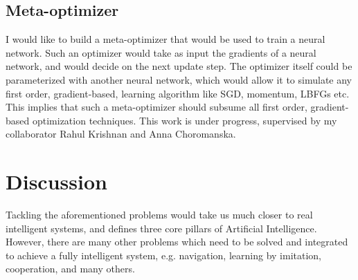 \documentclass{article}
\begin{document}
\subsection{Meta-optimizer}
\label{subsec:meta}
I would like to build a meta-optimizer that would be used to train a
neural network.  Such an optimizer would take as input the gradients
of a neural network, and would decide on the next update step. The
optimizer itself could be parameterized with another neural network,
which would allow it to simulate any first order, gradient-based,
learning algorithm like SGD, momentum, LBFGs etc. This implies that
such a meta-optimizer should subsume all first order, gradient-based
optimization techniques.  This work is under progress, 
supervised by my collaborator Rahul Krishnan and Anna Choromanska.

\section{Discussion}
Tackling the aforementioned problems would take us much closer to
real intelligent systems, and defines three core pillars 
of Artificial Intelligence. However, there are many other problems which 
need to be solved and integrated to achieve a fully 
intelligent system, e.g. navigation, learning by imitation, cooperation, and many others.









\end{document}

